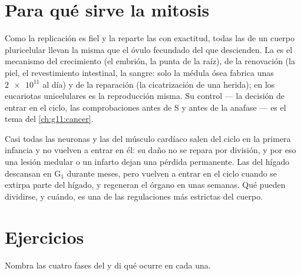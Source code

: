 \section{Para qué sirve la mitosis}

\begin{proposition}\label{prop:g11:cell-cycle-mitosis:conformity}
Como la replicación es fiel y la  reparte las  con
exactitud, todas las  de un cuerpo pluricelular llevan la misma
 que el óvulo fecundado del que descienden. La
 es el mecanismo del crecimiento (el embrión, la punta de la
raíz), de la renovación (la piel, el revestimiento intestinal, la
sangre: solo la médula ósea fabrica unas $\num{2e11}$  al día) y
de la reparación (la cicatrización de una herida); en los eucariotas
unicelulares es la reproducción misma. Su control --- la decisión de
entrar en el ciclo, las comprobaciones antes de S y antes de la
anafase --- es el tema del \cref{ch:g11:cancer}.
\end{proposition}
\admitted

\begin{remark}\label{rem:g11:cell-cycle-mitosis:notall}
Casi todas las neuronas y las  del músculo cardíaco salen del
ciclo en la primera infancia y no vuelven a entrar en él: su daño no se
repara por división, y por eso una lesión medular o un infarto dejan
una pérdida permanente. Las  del hígado descansan en
$\mathrm{G_1}$ durante meses, pero vuelven a entrar en el ciclo cuando
se extirpa parte del hígado, y regeneran el órgano en unas semanas. Qué
 pueden dividirse, y cuándo, es una de las regulaciones más
estrictas del cuerpo.
\end{remark}

\section{Ejercicios}

\begin{exercise}[$\star$]\label{exo:g11:cell-cycle-mitosis:1}
Nombra las cuatro fases del  y di qué ocurre en cada una.
\end{exercise}

